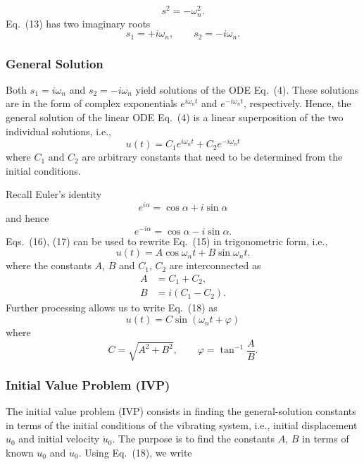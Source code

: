 \begin{equation}
    s^2=-\omega_n^2.
    \tag{13}
\end{equation}
Eq.~(13) has two imaginary roots
\begin{equation}
    s_1=+i\omega_n, \qquad s_2=-i\omega_n.
    \tag{14}
\end{equation}

\subsubsection{General Solution}
Both $s_1=i\omega_n$ and $s_2=-i\omega_n$ yield solutions of the ODE Eq.~(4). These solutions are in the form of complex exponentials $e^{i\omega_n t}$ and $e^{-i\omega_n t}$, respectively. Hence, the general solution of the linear ODE Eq.~(4) is a linear superposition of the two individual solutions, i.e.,
\begin{equation}
    u(t)=C_1e^{i\omega_n t}+C_2e^{-i\omega_n t}
    \tag{15}
\end{equation}
where $C_1$ and $C_2$ are arbitrary constants that need to be determined from the initial conditions.

Recall Euler's identity
\begin{equation}
    e^{i\alpha}=\cos\alpha+i\sin\alpha
    \tag{16}
\end{equation}
and hence
\begin{equation}
    e^{-i\alpha}=\cos\alpha-i\sin\alpha.
    \tag{17}
\end{equation}
Eqs.~(16), (17) can be used to rewrite Eq.~(15) in trigonometric form, i.e.,
\begin{equation}
    u(t)=A\cos\omega_n t+B\sin\omega_n t.
    \tag{18}
\end{equation}
where the constants $A$, $B$ and $C_1$, $C_2$ are interconnected as
\begin{align}
    A&=C_1+C_2, \tag{19}\\
    B&=i(C_1-C_2). \tag{20}
\end{align}
Further processing allows us to write Eq.~(18) as
\begin{equation}
    u(t)=C\sin(\omega_n t+\varphi)
    \tag{21}
\end{equation}
where
\begin{equation}
    C=\sqrt{A^2+B^2}, \qquad \varphi=\tan^{-1}\frac{A}{B}.
    \tag{22}
\end{equation}

\subsubsection{Initial Value Problem (IVP)}
The initial value problem (IVP) consists in finding the general-solution constants in terms of the initial conditions of the vibrating system, i.e., initial displacement $u_0$ and initial velocity $\dot{u}_0$. The purpose is to find the constants $A$, $B$ in terms of known $u_0$ and $\dot{u}_0$. Using Eq.~(18), we write

